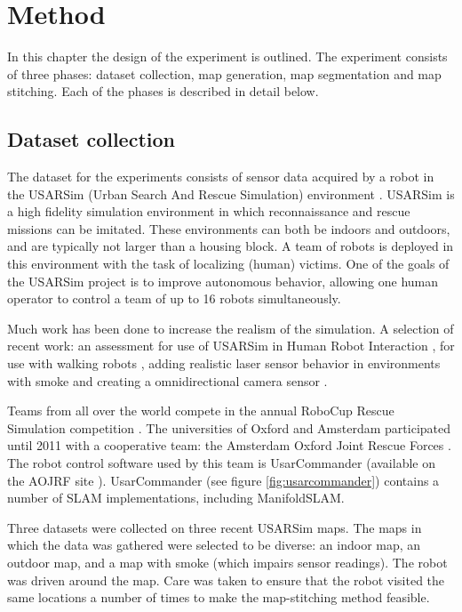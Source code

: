 \chapter{Method}
\label{method}

In this chapter the design of the experiment is outlined. The experiment consists of three phases: dataset collection, map generation, map segmentation and map stitching. Each of the phases is described in detail below.

\section{Dataset collection}
The dataset for the experiments consists of sensor data acquired by a robot in the USARSim (Urban Search And Rescue Simulation) environment \cite{balaguer2008usarsim, usarsimsite}. USARSim is a high fidelity simulation environment in which reconnaissance and rescue missions can be imitated. These environments can both be indoors and outdoors, and are typically not larger than a housing block. A team of robots is deployed in this environment with the task of localizing (human) victims. One of the goals of the USARSim project is to improve autonomous behavior, allowing one human operator to control a team of up to 16 robots simultaneously.

Much work has been done to increase the realism of the simulation. A selection of recent work: an assessment for use of USARSim in Human Robot Interaction \cite{wang2005validating}, for use with walking robots \cite{van2012validation}, adding realistic laser sensor behavior in environments with smoke \cite{formsma2011realistic} and creating a omnidirectional camera sensor \cite{schmits2009omnidirectional}.

Teams from all over the world compete in the annual RoboCup Rescue Simulation competition \cite{robocupsite}. The universities of Oxford and Amsterdam participated until 2011 with a cooperative team: the Amsterdam Oxford Joint Rescue Forces \cite{aojrf2011, visser2012uva}. The robot control software used by this team is UsarCommander (available on the AOJRF site \cite{jrfsite}). UsarCommander (see figure \ref{fig:usarcommander}) contains a number of SLAM implementations, including ManifoldSLAM.

Three datasets were collected on three recent USARSim maps. The maps in which the data was gathered were selected to be diverse: an indoor map, an outdoor map, and a map with smoke (which impairs sensor readings). The robot was driven around the map. Care was taken to ensure that the robot visited the same locations a number of times to make the map-stitching method feasible.

